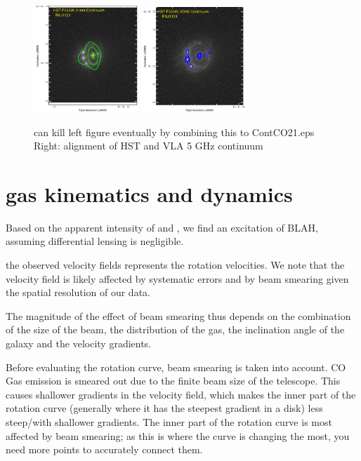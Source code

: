 \begin{figure}[!htbp]
\centering
\includegraphics[width=0.35\textwidth]{../Figures/F555W_ContPdBI.eps}
\includegraphics[width=0.35\textwidth]{../Figures/F555W_ContVLA.eps}
\caption{
can kill left figure eventually by combining this to ContCO21.eps
Right: alignment of HST and VLA 5 GHz continuum
 \label{fig:}}
\end{figure}


\section{gas kinematics and dynamics}

Based on the apparent intensity of  \cco and \bco, we find an excitation of BLAH, assuming differential lensing is negligible.

the observed velocity fields represents the rotation velocities.  
We note that the velocity field is likely affected by
systematic errors and by beam smearing given the spatial resolution of our data.

The magnitude of the
effect of beam smearing thus depends on the combination of
the size of the beam, the distribution of the gas, the inclination
angle of the galaxy and the velocity gradients.

Before evaluating the rotation curve, beam smearing is taken into account. CO Gas emission is smeared out due to the finite 
beam size of the telescope. This causes shallower gradients in the velocity field, which makes the inner part of the rotation 
curve (generally where it has the steepest gradient in a disk) less steep/with shallower gradients.  
The inner part of the rotation curve is most affected by beam smearing; as this is 
where the curve is changing the most, you need more points to accurately connect them. 

